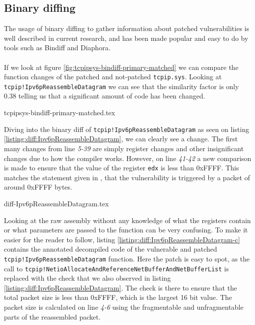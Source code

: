\documentclass{report}
\begin{document}
\subsection{Binary diffing}
The usage of binary diffing to gather information about patched vulnerabilities is well described in current research\cite{url:binary-diffing:1}\cite{url:binary-diffing:2}, and has been made popular and easy to do by tools such as Bindiff\cite{url:bindiff:homepage} and Diaphora\cite{url:diaphora:homepage}. 
\\
\\
If we look at figure \ref{fig:tcpipsys-bindiff-primary-matched} we can compare the function changes of the patched and not-patched \texttt{tcpip.sys}. Looking at \texttt{tcpip!Ipv6pReassembleDatagram} we can see that the similarity factor is only 0.38 telling us that a significant amount of code has been changed.

{tcpipsys-bindiff-primary-matched.tex}

Diving into the binary diff of \texttt{tcpip!Ipv6pReassembleDatagram} as seen on listing \ref{listing:diff:Ipv6pReassembleDatagram}, we can clearly see a change. The first many changes from line \emph{5-39} are simply register changes and other insignificant changes due to how the compiler works. However, on line \emph{41-42} a new comparison is made to ensure that the value of the register \texttt{edx} is less than 0xFFFF. This matches the statement given in , that the vulnerability is triggered by a packet of around 0xFFFF bytes.

{diff-Ipv6pReassembleDatagram.tex}

Looking at the raw assembly without any knowledge of what the registers contain or what parameters are passed to the function can be very confusing. To make it easier for the reader to follow, listing \ref{listing:diff:Ipv6pReassembleDatagram-c} contains the annotated decompiled code of the vulnerable and patched \texttt{tcpip!Ipv6pReassembleDatagram} function. Here the patch is easy to spot, as the call to \texttt{tcpip!NetioAllocateAndReferenceNetBufferAndNetBufferList} is replaced with the check that we also observed in listing \ref{listing:diff:Ipv6pReassembleDatagram}. The check is there to ensure that the total packet size is less than 0xFFFF, which is the largest 16 bit value. The packet size is calculated on line \emph{4-6} using the fragmentable and unfragmentable parts of the reassembled packet.
\end{document}
